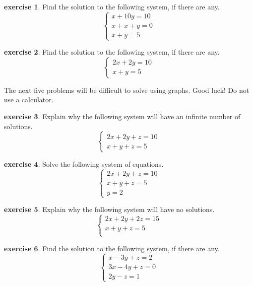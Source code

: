 \documentclass{scrbook}
\theoremstyle{definition}
\newtheorem{exercise}{exercise}[subsection]
\begin{document}
\begin{exercise} Find the solution to the following system, if there are any.
  \[
    \begin{cases}
      x + 10y = 10\\
      x + x + y = 0\\
      x + y = 5
    \end{cases}
  \]
\end{exercise}

\begin{exercise} Find the solution to the following system, if there are any.
  \[
    \begin{cases}
      2x + 2y = 10\\
      x + y = 5
    \end{cases}
  \]
\end{exercise}

The next five problems will be difficult to solve using graphs. Good luck! Do not use a calculator.

\begin{exercise} Explain why the following system will have an infinite number of solutions.
  \[
    \begin{cases}
      2x + 2y + z = 10\\
      x + y + z = 5
    \end{cases}
  \]
\end{exercise}

\begin{exercise} Solve the following system of equations.
  \[
    \begin{cases}
      2x + 2y + z = 10\\
      x + y + z = 5\\
      y = 2
    \end{cases}
  \]
\end{exercise}

\begin{exercise} Explain why the following system will have no solutions.
  \[
    \begin{cases}
      2x + 2y + 2z = 15\\
      x + y + z = 5\\
    \end{cases}
  \]
\end{exercise}

\begin{exercise} Find the solution to the following system, if there are any.
  \[
    \begin{cases}
      x - 3y + z = 2\\
      3 x - 4 y + z = 0\\
      2 y - z = 1
    \end{cases}
  \]
\end{exercise}
\end{document}
